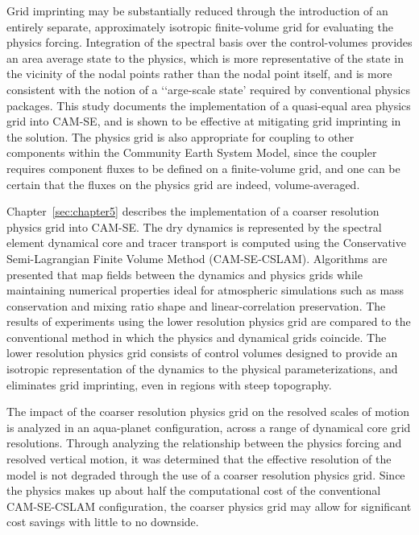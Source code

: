 Grid imprinting may be substantially reduced through the introduction of an entirely separate, approximately isotropic finite-volume grid for evaluating the physics forcing. Integration of the spectral basis over the control-volumes provides an area average state to the physics, which is more representative of the state in the vicinity of the nodal points rather than the nodal point itself, and is more consistent with the notion of a ‘`arge-scale state’ required by conventional physics packages. This study documents the implementation of a quasi-equal area physics grid into CAM-SE, and is shown to be effective at mitigating grid imprinting in the solution. The physics grid is also appropriate for coupling to other components within the Community Earth System Model, since the coupler requires component fluxes to be defined on a finite-volume grid, and one can be certain that the fluxes on the physics grid are indeed, volume-averaged.

Chapter~\ref{sec:chapter5} describes the implementation of a coarser resolution physics grid into CAM-SE. The dry dynamics is represented by the spectral element dynamical core and tracer transport is computed using the Conservative Semi-Lagrangian Finite Volume Method (CAM-SE-CSLAM). Algorithms are presented that map fields between the dynamics and physics grids while maintaining numerical properties ideal for atmospheric simulations such as mass conservation and mixing ratio shape and linear-correlation preservation. The results of experiments using the lower resolution physics grid are compared to the conventional method in which the physics and dynamical grids coincide. The lower resolution physics grid consists of control volumes designed to provide an isotropic representation of the dynamics to the physical parameterizations, and eliminates grid imprinting, even in regions with steep topography. 

The impact of the coarser resolution physics grid on the resolved scales of motion is analyzed in an aqua-planet configuration, across a range of dynamical core grid resolutions. Through analyzing the relationship between the physics forcing and resolved vertical motion, it was determined that the effective resolution of the model is not degraded through the use of a coarser resolution physics grid. Since the physics makes up about half the computational cost of the conventional CAM-SE-CSLAM configuration, the coarser physics grid may allow for significant cost savings with little to no downside.

